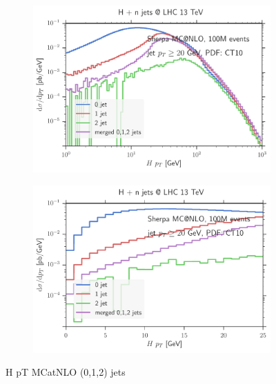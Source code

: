 \begin{figure}
\centering
\begin{subfigure}[]{0.49\textwidth}
	\includegraphics[width=\textwidth]{images/cmp100m_mcatnlo_hpt.pdf}
\end{subfigure}
\hfill
\begin{subfigure}[]{0.49\textwidth}
	\includegraphics[width=\textwidth]{images/cmp100m_mcatnlo_hptpeak.pdf}
\end{subfigure}
\caption{H pT MCatNLO (0,1,2) jets}
\end{figure}
%


